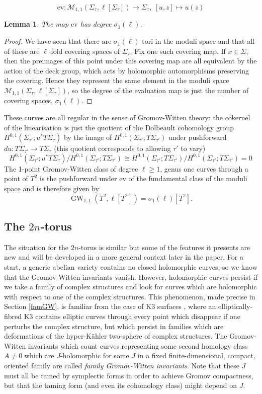 \documentclass[11pt]{amsart}
\newcommand{\mM}{\mathcal{M}}
\newcommand{\ev}{\mathrm{ev}}
\newcommand{\GW}{\operatorname{GW}}
\numberwithin{equation}{section}
\newtheorem{lma}[equation]{Lemma}
\theoremstyle{definition}
\theoremstyle{remark}
\begin{document}
\[\ev\colon\mM_{1,1}(\Sigma_{\tau},\ell[\Sigma_{\tau}])\to \Sigma_{\tau},\ [u,z]\mapsto u(z)\]
\begin{lma}
The map $\ev$ has degree $\sigma_1(\ell)$.
\end{lma}
\begin{proof}
We have seen that there are $\sigma_1(\ell)$ tori in the moduli space and that all of these are $\ell$-fold covering spaces of $\Sigma_{\tau}$. Fix one such covering map. If $x\in\Sigma_{\tau}$ then the preimages of this point under this covering map are all equivalent by the action of the deck group, which acts by holomorphic automorphisms preserving the covering. Hence they represent the same element in the moduli space $\mM_{1,1}(\Sigma_{\tau},\ell[\Sigma_{\tau}])$, so the degree of the evaluation map is just the number of covering spaces, $\sigma_1(\ell)$.
\end{proof}
These curves are all regular in the sense of Gromov-Witten theory: the cokernel of the linearisation is just the quotient of the Dolbeault cohomology group $H^{0,1}(\Sigma_{\tau'};u^*T\Sigma_{\tau})$ by the image of $H^{0,1}(\Sigma_{\tau'};T\Sigma_{\tau'})$ under pushforward $du\colon T\Sigma_{\tau'}\to T\Sigma_{\tau}$ (this quotient corresponds to allowing $\tau'$ to vary)
\[H^{0,1}(\Sigma_{\tau'};u^*T\Sigma_{\tau})/H^{0,1}(\Sigma_{\tau'};T\Sigma_{\tau'})\cong H^{0,1}(\Sigma_{\tau'};T\Sigma_{\tau'})/H^{0,1}(\Sigma_{\tau'};T\Sigma_{\tau'})=0\]
The 1-point Gromov-Witten class of degree $\ell\geq 1$, genus one curves through a point of $T^2$ is the pushforward under $\ev$ of the fundamental class of the moduli space and is therefore given by
\[\GW_{1,1}(T^2,\ell[T^2])=\sigma_1(\ell)[T^2].\]


\subsection{The $2n$-torus}

The situation for the $2n$-torus is similar but some of the features it presents are new and will be developed in a more general context later in the paper. For a start, a generic abelian variety contains no closed holomorphic curves, so we know that the Gromov-Witten invariants vanish. However, holomorphic curves persist if we take a family of complex structures and look for curves which are holomorphic with respect to one of the complex structures. This phenomenon, made precise in Section \ref{famGW}, is familiar from the case of K3 surfaces \cite{BL}, where an elliptically-fibred K3 contains elliptic curves through every point which disappear if one perturbs the complex structure, but which persist in families which are deformations of the hyper-K\"{a}hler two-sphere of complex structures. The Gromov-Witten invariants which count curves representing some second homology class $A\neq 0$ which are $J$-holomorphic for some $J$ in a fixed finite-dimensional, compact, oriented family are called \emph{family Gromov-Witten invariants}. Note that these $J$ must all be tamed by symplectic forms in order to achieve Gromov compactness, but that the taming form (and even its cohomology class) might depend on $J$.
\end{document}
